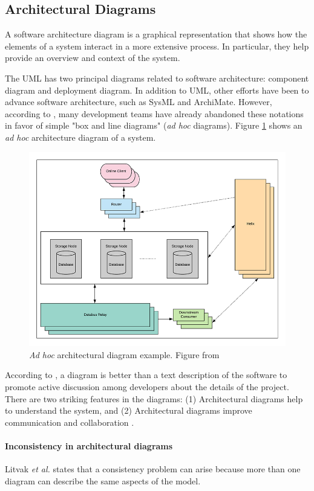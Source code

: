 \documentclass[sigconf]{acmart}
\begin{document}
\subsection{Architectural Diagrams}
A software architecture diagram is a graphical representation that shows how the elements of a system interact in a more extensive process. In particular, they help provide an overview and context of the system.

The UML has two principal diagrams related to software architecture: component diagram and deployment diagram. In addition to UML, other efforts have been to advance software architecture, such as SysML and ArchiMate. However, according to \cite{brown2021}, many development teams have already abandoned these notations in favor of simple "box and line diagrams" (\textit{ad hoc} diagrams). Figure \ref{fig:uml-diagrams-examples} shows an \textit{ad hoc} architecture diagram of a system.

\begin{figure}[!t]
\centering
\includegraphics[width=.8\columnwidth]{figures/diagram-10.png}
\caption{\textit{Ad hoc} architectural diagram example. Figure from  \cite{zhang2020}}
\label{fig:uml-diagrams-examples}
\end{figure}

According to \cite{jolak2020}, a diagram is better than a text description of the software to promote active discussion among developers about the details of the project. There are two striking features in the diagrams: (1) Architectural diagrams help to understand the system, and (2) Architectural diagrams improve communication and collaboration \cite{jolak2020}.

\paragraph{\textbf{Inconsistency in architectural diagrams}}
Litvak \textit{et al.} \cite{litvak2003} states that a consistency problem can arise because more than one diagram can describe the same aspects of the model.
\end{document}
